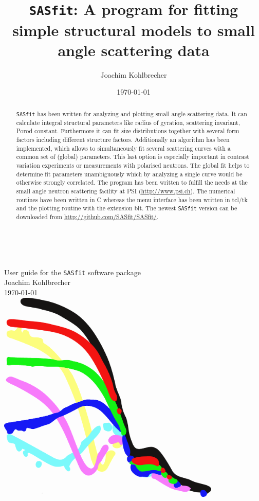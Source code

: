 \documentclass[12pt,intlimits,fleqn,reqno,twoside,english,a4wide]{amsbook}
\author[J. Kohlbrecher]{Joachim Kohlbrecher}
\numberwithin{equation}{chapter}
\numberwithin{figure}{chapter}
\numberwithin{section}{chapter}
\begin{document}
\sloppy

\setcounter{page}{0}
\thispagestyle{empty}
~\\
\begin{center}
{\Large User guide for the {\tt SASfit} software package} \\[1cm]

{\Large Joachim Kohlbrecher} ~\\[1.5cm]


\today
~\\[3.5cm]
\includegraphics[width=0.8\textwidth]{../images/SASfitIcon.png}
\end{center}


\title[SASfit]{{\tt SASfit}: A program for fitting simple
 structural models to small angle scattering data}

\date{\today}

\begin{abstract}
{\tt SASfit} has been written for analyzing and plotting small angle
scattering data. It can calculate integral structural parameters
like radius of gyration, scattering invariant, Porod constant.
Furthermore it can fit size distributions together with several form
factors including different structure factors. Additionally an
algorithm has been implemented, which allows to simultaneously fit
several scattering curves with a common set of (global) parameters.
This last option is especially important in contrast variation
experiments or measurements with polarised neutrons. The global fit
helps to determine fit parameters unambiguously which by analyzing a
single curve would be otherwise strongly correlated. The program has
been written to fulfill the needs at the small angle neutron
scattering facility at PSI (\url{http://www.psi.ch}). The
numerical routines have been written in C whereas the menu interface
has been written in tcl/tk and the plotting routine with the
extension blt. The newest {\tt SASfit} version can be downloaded
from \url{http://github.com/SASfit/SASfit/}.
\end{abstract}
\maketitle
\end{document}
